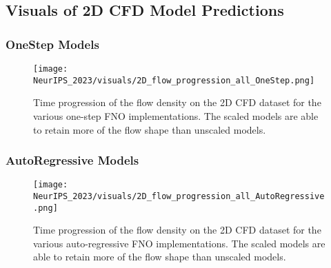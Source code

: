 \newpage
\subsection{Visuals of 2D CFD Model Predictions}

\subsubsection{OneStep Models}

\begin{figure}[h]
    \centering
    \texttt{[image: NeurIPS\_2023/visuals/2D\_flow\_progression\_all\_OneStep.png]}
    \caption{Time progression of the flow density on the 2D CFD dataset for the various one-step FNO implementations. The scaled models are able to retain more of the flow shape than unscaled models.}
    \label{fig:2d_time_os}
\end{figure}

\newpage
\subsubsection{AutoRegressive Models}

\begin{figure}[h]
    \centering
    \texttt{[image: NeurIPS\_2023/visuals/2D\_flow\_progression\_all\_AutoRegressive.png]}
    \caption{Time progression of the flow density on the 2D CFD dataset for the various auto-regressive FNO implementations. The scaled models are able to retain more of the flow shape than unscaled models.}
    \label{fig:2d_time_ar}
\end{figure}
